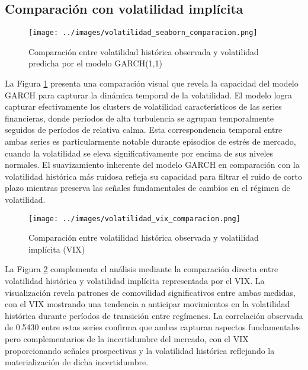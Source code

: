 \subsection{Comparación con volatilidad implícita}

\begin{figure}[hbt!]
    \centering
    \texttt{[image: ../images/volatilidad\_seaborn\_comparacion.png]}
    \caption{Comparación entre volatilidad histórica observada y volatilidad predicha por el modelo GARCH(1,1)}
    \label{fig:volatilidad_comparacion}   
\end{figure}

La Figura \ref{fig:volatilidad_comparacion} presenta una comparación visual que revela la capacidad del modelo GARCH para capturar la dinámica temporal de la volatilidad. El modelo logra capturar efectivamente los clusters de volatilidad característicos de las series financieras, donde períodos de alta turbulencia se agrupan temporalmente seguidos de períodos de relativa calma. Esta correspondencia temporal entre ambas series es particularmente notable durante episodios de estrés de mercado, cuando la volatilidad se eleva significativamente por encima de sus niveles normales. El suavizamiento inherente del modelo GARCH en comparación con la volatilidad histórica más ruidosa refleja su capacidad para filtrar el ruido de corto plazo mientras preserva las señales fundamentales de cambios en el régimen de volatilidad.

\begin{figure}[hbt!]
    \centering
    \texttt{[image: ../images/volatilidad\_vix\_comparacion.png]}
    \caption{Comparación entre volatilidad histórica observada y volatilidad implícita (VIX)}
    \label{fig:volatilidad_vix_comparacion}   
\end{figure}

La Figura \ref{fig:volatilidad_vix_comparacion} complementa el análisis mediante la comparación directa entre volatilidad histórica y volatilidad implícita representada por el VIX. La visualización revela patrones de comovilidad significativos entre ambas medidas, con el VIX mostrando una tendencia a anticipar movimientos en la volatilidad histórica durante períodos de transición entre regímenes. La correlación observada de 0.5430 entre estas series confirma que ambas capturan aspectos fundamentales pero complementarios de la incertidumbre del mercado, con el VIX proporcionando señales prospectivas y la volatilidad histórica reflejando la materialización de dicha incertidumbre.

